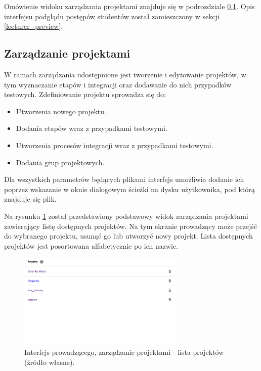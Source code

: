 Omówienie widoku zarządzania projektami znajduje się w podrozdziale \ref{lecturer-management}.
Opis interfejsu podglądu postępów studentów został zamieszczony w sekcji \ref{lecturer_preview}.

\subsection{Zarządzanie projektami}
\label{lecturer-management}

W ramach zarządzania udostępnione jest tworzenie i edytowanie projektów, w tym wyznaczanie etapów i integracji oraz dodawanie do nich przypadków testowych.
Zdefiniowanie projektu sprowadza się do:
\begin {itemize}
    \item Utworzenia nowego projektu.
    \item Dodania etapów wraz z przypadkami testowymi.
    \item Utworzenia procesów integracji wraz z przypadkami testowymi.
    \item Dodania grup projektowych.
\end {itemize}

Dla wszystkich parametrów będących plikami interfejs umożliwia dodanie ich poprzez wskazanie w oknie dialogowym ścieżki na dysku użytkownika, pod którą znajduje się plik.

Na rysunku \ref{fig:lecturer_projects_list} został przedstawiony podstawowy widok zarządzania projektami zawierający listę dostępnych projektów.
Na tym ekranie prowadzący może przejść do wybranego projektu, usunąć go lub utworzyć nowy projekt.
Lista dostępnych projektów jest posortowana alfabetycznie po ich nazwie.

\begin{figure}[h]
    \centering
    \includegraphics[width = 8cm]{chapter04/lecturer_projects_list.png}
    \caption{Interfejs prowadzącego, zarządzanie projektami - lista projektów (źródło własne).}
    \label{fig:lecturer_projects_list}
\end{figure}

